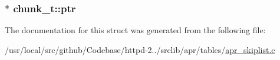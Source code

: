 \subsubsection[{\texorpdfstring{ptr}{ptr}}]{$\ast$ chunk\+\_\+t\+::ptr}\hypertarget{structchunk__t_a3a78ab4ca5fd5ca731a282d3b1a8e7d3}{}\label{structchunk__t_a3a78ab4ca5fd5ca731a282d3b1a8e7d3}


The documentation for this struct was generated from the following file\+:\begin{DoxyCompactItemize}
\item 
/usr/local/src/github/\+Codebase/httpd-\/2../srclib/apr/tables/\hyperlink{apr__skiplist_8c}{apr\+\_\+skiplist.\+c}\end{DoxyCompactItemize}
